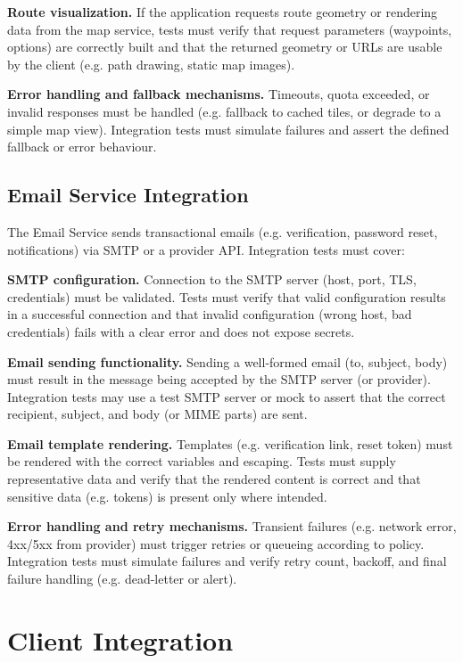 \textbf{Route visualization.}
If the application requests route geometry or rendering data from the map service, tests must verify that request parameters (waypoints, options) are correctly built and that the returned geometry or URLs are usable by the client (e.g. path drawing, static map images).

\textbf{Error handling and fallback mechanisms.}
Timeouts, quota exceeded, or invalid responses must be handled (e.g. fallback to cached tiles, or degrade to a simple map view). Integration tests must simulate failures and assert the defined fallback or error behaviour.

\subsection{Email Service Integration}
\label{subsec:email_service_integration}%

The Email Service sends transactional emails (e.g. verification, password reset, notifications) via SMTP or a provider API. Integration tests must cover:

\textbf{SMTP configuration.}
Connection to the SMTP server (host, port, TLS, credentials) must be validated. Tests must verify that valid configuration results in a successful connection and that invalid configuration (wrong host, bad credentials) fails with a clear error and does not expose secrets.

\textbf{Email sending functionality.}
Sending a well-formed email (to, subject, body) must result in the message being accepted by the SMTP server (or provider). Integration tests may use a test SMTP server or mock to assert that the correct recipient, subject, and body (or MIME parts) are sent.

\textbf{Email template rendering.}
Templates (e.g. verification link, reset token) must be rendered with the correct variables and escaping. Tests must supply representative data and verify that the rendered content is correct and that sensitive data (e.g. tokens) is present only where intended.

\textbf{Error handling and retry mechanisms.}
Transient failures (e.g. network error, 4xx/5xx from provider) must trigger retries or queueing according to policy. Integration tests must simulate failures and verify retry count, backoff, and final failure handling (e.g. dead-letter or alert).

\section{Client Integration}
\label{sec:client_integration}%

